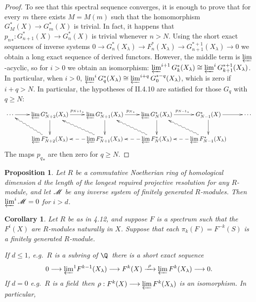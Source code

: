\documentclass[11pt]{article}
\theoremstyle{plain}
\newtheorem{prop}[thm]{Proposition}
\newtheorem{cor}[thm]{Corollary}
\theoremstyle{definition}
\begin{document}
{\begin{proof}
To see that this spectral sequence converges, it is enough to prove that for
every $m$ there exists $M=M(m)$ such that the homomorphism $G^*_M(X)\to
G^*_m(X)$ is trivial. In fact, it happens that ${p_n}_*:G^*_{n+1}(X)\to
G^*_{n}(X)$ is trivial whenever $n>N$. Using the short exact sequences of
inverse systems $0\to G_n^*(X_\lambda)\to F_n^*(X_\lambda)\to
G_{n+1}^{*+1}(X_\lambda)\to0$ we obtain a long exact sequence of derived
functors. However, the middle term is $\varprojlim$-acyclic, so for $i>0$ we
obtain an isomorphism: $\varprojlim^{i+1} G^*_k(X_\lambda)\cong\varprojlim^i
G^{*+1}_{k+1}(X_\lambda)$.
In particular, when $i>0$, $\varprojlim^{i}
G^*_q(X_\lambda)\cong\varprojlim^{i+q} G^{*-q}_{0}(X_\lambda)$, which is zero if
$i+q>N$. In particular, the hypotheses of II.4.10 are satisfied for those $G_q$
with $q\geq N$:
\[\xymatrix{
\cdots\ar[r]&
\varprojlim G^*_{N+2}(X_\lambda)\ar[r]^{{p_{N+1}}_*}\ar[d]&
\varprojlim G^*_{N+1}(X_\lambda)\ar[r]^{{p_N}_*}\ar[d]&
\varprojlim G^*_N(X_\lambda)\ar[d]\ar[r]^{{p_{N-1}}_*}&
G^*_{N-1}(X)\ar[d]\ar[r]&\cdots\\%
&\varprojlim F^*_{N+2}(X_\lambda)\ar@{~>}[lu]
&\varprojlim F^*_{N+1}(X_\lambda)\ar@{~>}[lu]\ar@{-->}[l]
&\varprojlim F^*_N(X_\lambda)\ar@{~>}[lu]\ar@{-->}[l]
&\varprojlim F^*_{N-1}(X_\lambda)\ar@{~>}[lu]\ar@{-->}[l]
}\]
The maps ${p_q}_*$ are then zero for $q\geq N$.
\end{proof}
\setcounter{thm}{14}
\begin{prop}
Let $R$ be a commutative Noetherian ring of homological dimension $d$ \lparen
the length of the longest required projective resolution for any
$R$-module\rparen, and let $\scrM$ be any inverse system of finitely generated
$R$-modules. Then $\varprojlim^i\scrM=0$ for $i>d$.
\end{prop}
\begin{cor}
Let $R$ be as in 4.12, and suppose $F$ is a spectrum such that the $F^i(X)$ are
$R$-modules naturally in $X$. Suppose that each $\pi_k(F)=F^{-k}(S)$ is a
finitely generated $R$-module.
\begin{itemise}
\itm[(i)]If $d\leq1$, \lparen e.g.\ $R$ is a subring of $\Q$\rparen\ there is a
short exact sequence\upcol
\[0\to{\textstyle\varprojlim^1}F^{k-1}(X_\lambda)\to F^k(X)\xrightarrow{\ \rho\
}\varprojlim F^k(X_\lambda)\to0.\]
\itm[(ii)]If $d=0$ \lparen e.g.\ $R$ is a field\rparen\ then
$\rho:F^k(X)\to\varprojlim F^k(X_\lambda)$ is an isomorphism. In particular,

\end{itemise}
\end{cor}}
\end{document}
